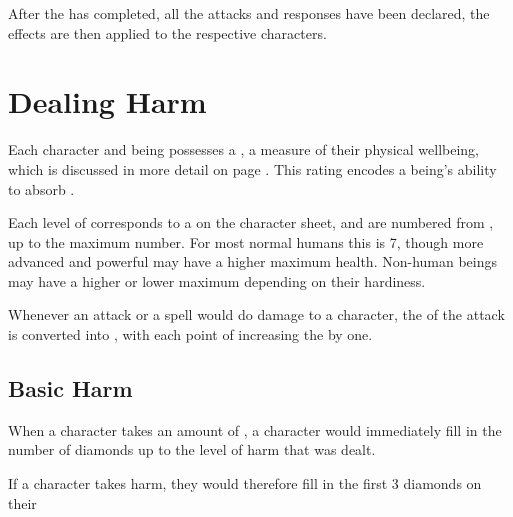 

After the  has completed, all the attacks and responses have been declared, the effects are then applied to the respective characters. 



\section{Dealing Harm}

Each character and being possesses a , a measure of their physical wellbeing, which is discussed in more detail on page \pageref{S:Health}. This  rating encodes a being's ability to absorb .

Each level of  corresponds to a  on the character sheet, and are numbered from , up to the maximum number. For most normal humans this is 7, though more advanced and powerful may have a higher maximum health. Non-human beings may have a higher or lower maximum  depending on their hardiness. 

Whenever an attack or a spell would do damage to a character, the  of the attack is converted into , with each point of  increasing the  by one.  

\subsection{Basic Harm}

When a character takes an amount of , a character would immediately fill in the number of diamonds up to the level of harm that was dealt. 

If a character takes  harm, they would therefore fill in the first 3 diamonds on their 

\newcommand\df[1]
{
	\begin{tikzpicture}
		\def\r{0.1}
		\def\theta{45}
		\def\dfill{white}
		\if#15
			\def\dfill{black}
		\fi
		\draw[rotate =\theta,fill = \dfill] ({-\r},{-\r}) rectangle ({\r},{\r});
		
		\ifnum#1>0
			\draw[rotate =\theta,fill = \dfill] ({-\r},{-\r}) -- ({\r},{\r});
			
			\ifnum#1>1
				
				\draw[rotate =\theta,fill = \dfill] ({-\r},{\r}) -- ({\r},{-\r});
				\ifnum#1>2
					
					\draw[rotate =\theta,fill = \dfill] ({-\r},{0}) -- ({\r},{0});
					
					\ifnum#1>3
						
						\draw[rotate =\theta] ({0},{-\r}) -- ({0},{\r});
					\fi
					
				\fi
			\fi
		\fi
		
	\end{tikzpicture}
}

